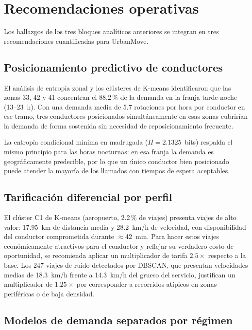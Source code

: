 \documentclass[12pt, a4paper]{article}
\begin{document}
\section{Recomendaciones operativas}
\label{sec:recomendaciones}

Los hallazgos de los tres bloques analíticos anteriores se integran en tres recomendaciones cuantificadas para UrbanMove.

\subsection{Posicionamiento predictivo de conductores}

El análisis de entropía zonal y los clústeres de K-means identificaron que las zonas 33, 42 y 41 concentran el 88{.}2\,\% de la demanda en la franja tarde-noche (13--23~h). Con una demanda media de 5{.}7 rotaciones por hora por conductor en ese tramo, tres conductores posicionados simultáneamente en esas zonas cubrirían la demanda de forma sostenida sin necesidad de reposicionamiento frecuente.

La entropía condicional mínima en madrugada ($H = 2{.}1325$~bits) respalda el mismo principio para las horas nocturnas: en esa franja la demanda es geográficamente predecible, por lo que un único conductor bien posicionado puede atender la mayoría de los llamados con tiempos de espera aceptables.

\subsection{Tarificación diferencial por perfil}

El clúster C1 de K-means (aeropuerto, 2{.}2\,\% de viajes) presenta viajes de alto valor: 17{.}95~km de distancia media y 28{.}2~km/h de velocidad, con disponibilidad del conductor comprometida durante $\approx$42~min. Para hacer estos viajes económicamente atractivos para el conductor y reflejar su verdadero costo de oportunidad, se recomienda aplicar un multiplicador de tarifa $2{.}5\times$ respecto a la base. Los 247 viajes de ruido detectados por DBSCAN, que presentan velocidades medias de 18{.}3~km/h frente a 14{.}3~km/h del grueso del servicio, justifican un multiplicador de $1{.}25\times$ por corresponder a recorridos atípicos en zonas periféricas o de baja densidad.

\subsection{Modelos de demanda separados por régimen}
\end{document}
